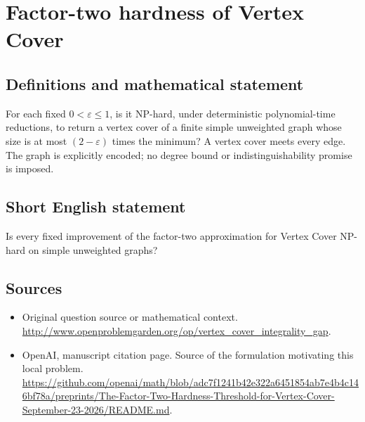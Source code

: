 \documentclass[11pt]{article}
\begin{document}
\section*{Factor-two hardness of Vertex Cover}\label{30007495}
\subsection{Definitions and mathematical statement}
For each fixed $0<\varepsilon\le1$, is it NP-hard, under deterministic polynomial-time reductions, to return a vertex cover of a finite simple unweighted graph whose size is at most $(2-\varepsilon)$ times the minimum? A vertex cover meets every edge. The graph is explicitly encoded; no degree bound or indistinguishability promise is imposed.

\subsection{Short English statement}
Is every fixed improvement of the factor-two approximation for Vertex Cover NP-hard on simple unweighted graphs?

\subsection{Sources}
\begin{itemize}
\item[S1] Original question source or mathematical context.
\url{http://www.openproblemgarden.org/op/vertex_cover_integrality_gap}.
\item[S2] OpenAI, manuscript citation page. Source of the formulation motivating this local problem.
\url{https://github.com/openai/math/blob/adc7f1241b42e322a6451854ab7e4b4c146bf78a/preprints/The-Factor-Two-Hardness-Threshold-for-Vertex-Cover-September-23-2026/README.md}.
\end{itemize}
\end{document}
